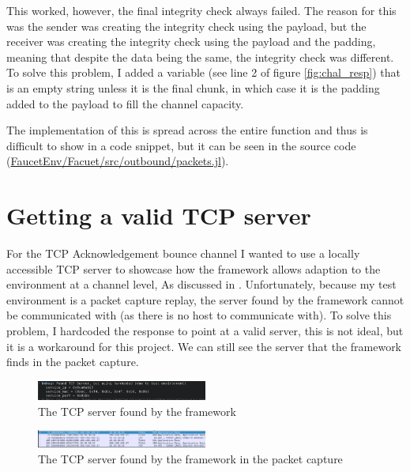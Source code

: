 This worked, however, the final integrity check always failed. The reason for this was the sender was creating the integrity check using the payload, but the receiver was creating the integrity check using the payload and the padding, meaning that despite the data being the same, the integrity check was different. To solve this problem, I added a variable  (see line 2 of figure \ref{fig:chal_resp}) that is an empty string unless it is the final chunk, in which case it is the padding added to the payload to fill the channel capacity. 

The implementation of this is spread across the entire  function and thus is difficult to show in a code snippet, but it can be seen in the source code (\url{FaucetEnv/Facuet/src/outbound/packets.jl}).

\section{Getting a valid TCP server}

For the TCP Acknowledgement bounce channel I wanted to use a locally accessible TCP server to showcase how the framework allows adaption to the environment at a channel level, As discussed in . Unfortunately, because my test environment is a packet capture replay, the server found by the framework cannot be communicated with (as there is no host to communicate with). To solve this problem, I hardcoded the response to point at a valid server, this is not ideal, but it is a workaround for this project. We can still see the server that the framework finds in the packet capture.

\begin{figure}[h]
    \centering
    \includegraphics[width=0.5\textwidth]{fig/GET_TCP_debug.png}
    \caption{The TCP server found by the framework}
    \label{fig:tcp_server}
\end{figure}

\begin{figure}[h]
    \centering
    \includegraphics[width=0.5\textwidth]{fig/GET_TCP_pcap.png}
    \caption{The TCP server found by the framework in the packet capture}
    \label{fig:tcp_server_pcap}
\end{figure}

